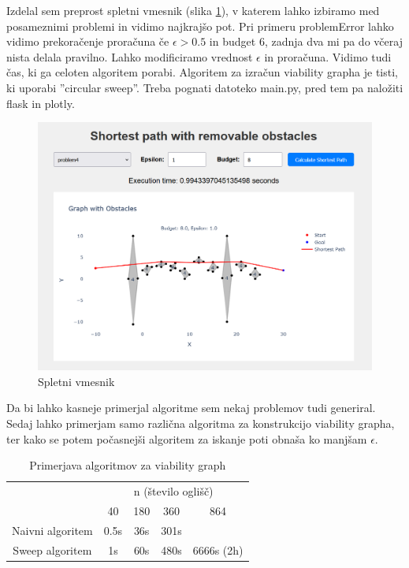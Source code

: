 \documentclass{article}
\begin{document}
Izdelal sem preprost spletni vmesnik (slika \ref{fig:web}), v katerem lahko izbiramo med posameznimi problemi in vidimo najkrajšo pot. Pri primeru problemError lahko vidimo prekoračenje proračuna če $\epsilon > 0.5$ in budget $6$, zadnja dva mi pa do včeraj nista delala pravilno. Lahko modificiramo vrednost $\epsilon$ in proračuna. Vidimo tudi čas, ki ga celoten algoritem porabi. Algoritem za izračun viability grapha je tisti, ki uporabi ''circular sweep''. Treba pognati datoteko main.py, pred tem pa naložiti flask in plotly.

\begin{figure}[ht]
    \centering
    \includegraphics[width=1\textwidth]{web.png}
    \caption{Spletni vmesnik}
    \label{fig:web}
\end{figure}

Da bi lahko kasneje primerjal algoritme sem nekaj problemov tudi generiral. Sedaj lahko primerjam samo različna algoritma za konstrukcijo viability grapha, ter kako se potem počasnejši algoritem za iskanje poti obnaša ko manjšam $\epsilon$.

\begin{table}[h]
    \centering
    \begin{tabular}{|c|c|c|c|c|}
        \hline
        & \multicolumn{4}{c|}{n (število oglišč)} \\
        \cline{2-5}
        & 40 & 180 & 360 & 864 \\
        \hline
        Naivni algoritem & 0.5s & 36s &  301s &  \\
        \hline
        Sweep algoritem & 1s & 60s & 480s  & 6666s  (2h) \\
        \hline
    \end{tabular}
    \caption{Primerjava algoritmov za viability graph}
    \label{tab:simple_table}
\end{table}
\end{document}
